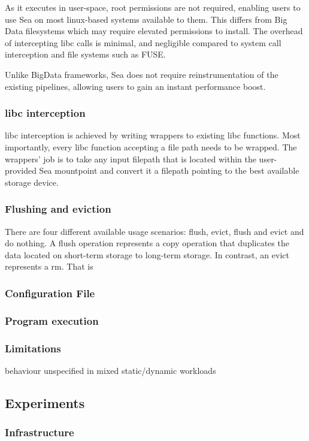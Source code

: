 \documentclass[10pt,journal,compsoc]{IEEEtran}
\begin{document}
As it executes in user-space, root permissions are not required, enabling users to use Sea on most linux-based systems
available to them. This differs from Big Data filesystems which may require elevated permissions to install.
The overhead of intercepting libc calls
is minimal, and negligible compared to system call interception and file systems such as FUSE.

Unlike BigData frameworks, Sea does not require reinstrumentation of the existing pipelines, allowing
users to gain an instant performance boost.

\subsubsection{libc interception}

libc interception is achieved by writing wrappers to existing libc functions. Most importantly, every
libc function accepting a file path needs to be wrapped. The wrappers' job is to take any input filepath
that is located within the user-provided Sea mountpoint and convert it a filepath pointing to the best available storage device.

\subsubsection{Flushing and eviction}
There are four different available usage scenarios: flush, evict, flush and evict and do nothing.
A flush operation represents a copy operation that duplicates the data located on short-term storage to long-term storage.
In contrast, an evict represents a rm. That is 
\subsubsection{Configuration File}
\subsubsection{Program execution}
\subsubsection{Limitations}
behaviour unspecified in mixed static/dynamic workloads

\subsection{Experiments}
\subsubsection{Infrastructure}
\end{document}
